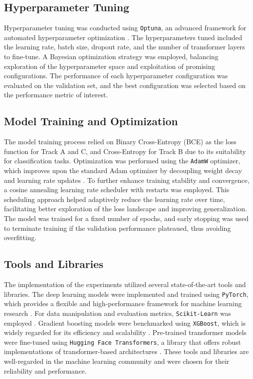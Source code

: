 \subsection{Hyperparameter Tuning}

Hyperparameter tuning was conducted using \texttt{Optuna}, an advanced framework for automated hyperparameter optimization \citep{Akiba2019Optuna}. The hyperparameters tuned included the learning rate, batch size, dropout rate, and the number of transformer layers to fine-tune. A Bayesian optimization strategy was employed, balancing exploration of the hyperparameter space and exploitation of promising configurations. The performance of each hyperparameter configuration was evaluated on the validation set, and the best configuration was selected based on the performance metric of interest.

\subsection{Model Training and Optimization}

The model training process relied on Binary Cross-Entropy (BCE) as the loss function for Track A and C, and Cross-Entropy for Track B due to its suitability for classification tasks. Optimization was performed using the \texttt{AdamW} optimizer, which improves upon the standard Adam optimizer by decoupling weight decay and learning rate updates \citep{Loshchilov2019AdamW}. To further enhance training stability and convergence, a cosine annealing learning rate scheduler with restarts was employed. This scheduling approach helped adaptively reduce the learning rate over time, facilitating better exploration of the loss landscape and improving generalization. The model was trained for a fixed number of epochs, and early stopping was used to terminate training if the validation performance plateaued, thus avoiding overfitting.

\subsection{Tools and Libraries}

The implementation of the experiments utilized several state-of-the-art tools and libraries. The deep learning models were implemented and trained using \texttt{PyTorch}, which provides a flexible and high-performance framework for machine learning research \citep{Paszke2019PyTorch}. For data manipulation and evaluation metrics, \texttt{Scikit-Learn} was employed \citep{Pedregosa2011ScikitLearn}. Gradient boosting models were benchmarked using \texttt{XGBoost}, which is widely regarded for its efficiency and scalability \citep{chen2016xgboost}. Pre-trained transformer models were fine-tuned using \texttt{Hugging Face Transformers}, a library that offers robust implementations of transformer-based architectures \citep{Wolf2019HuggingFace}. These tools and libraries are well-regarded in the machine learning community and were chosen for their reliability and performance.

